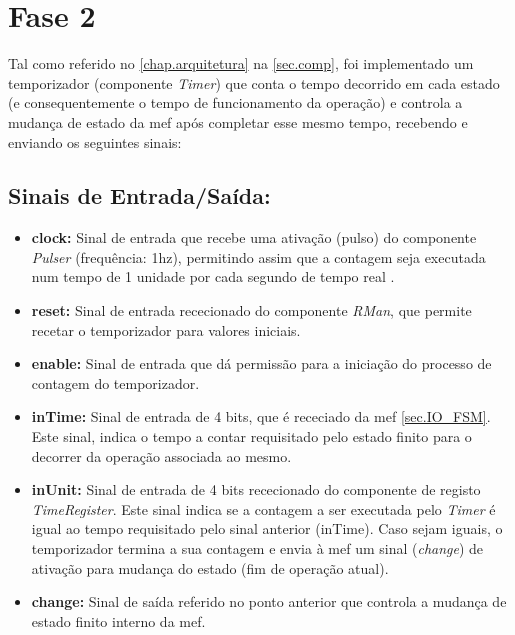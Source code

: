 \section{Fase 2}
\label{sec.fase2}

Tal como referido no \autoref{chap.arquitetura} na \autoref{sec.comp}, foi implementado um temporizador (componente \textit{Timer}) que conta o tempo decorrido em cada estado (e consequentemente o tempo de funcionamento da operação) e controla a mudança de estado da \ac{mef} após completar esse mesmo tempo, recebendo e enviando os seguintes sinais:

\subsection{Sinais de Entrada/Saída:} 
\label{sec.IO_Timer}
\begin{itemize}

	\item\textbf{clock:} Sinal de entrada que recebe uma ativação (pulso) do componente \textit{Pulser} (frequência: 1hz), permitindo assim que a contagem seja executada num tempo de 1 unidade por cada segundo de tempo real .
	
	\item\textbf{reset:} Sinal de entrada rececionado do componente \textit{RMan}, que permite recetar o temporizador para valores iniciais.
	
	\item\textbf{enable:} Sinal de entrada que dá permissão para a iniciação do processo de contagem do temporizador.
	
	\item\textbf{inTime:} Sinal de entrada de 4 bits, que é receciado da \ac{mef} \autoref{sec.IO_FSM}. Este sinal, indica o tempo a contar requisitado pelo estado finito para o decorrer da operação associada ao mesmo.
	
	\item\textbf{inUnit:} Sinal de entrada de 4 bits rececionado do componente de registo \textit{TimeRegister}. Este sinal indica se a contagem a ser executada pelo \textit{Timer} é igual ao tempo requisitado pelo sinal anterior (inTime). Caso sejam iguais, o temporizador termina a sua contagem e envia à \ac{mef} um sinal (\textit{change}) de ativação para mudança do estado (fim de operação atual).
	
	\item\textbf{change:} Sinal de saída referido no ponto anterior que controla a mudança de estado finito interno da \ac{mef}.
	

\end{itemize}
